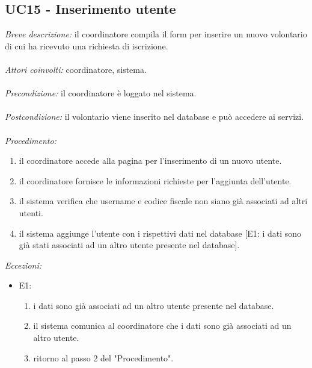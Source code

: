\subsection{UC15 - Inserimento utente}
\textit{Breve descrizione:} il coordinatore compila il form per inserire un nuovo volontario di cui ha ricevuto una richiesta di iscrizione. 
\\
\\
\textit{Attori coinvolti:} coordinatore, sistema.
\\
\\
\textit{Precondizione:} il coordinatore è loggato nel sistema.
\\
\\
\textit{Postcondizione:} il volontario viene inserito nel database e può accedere ai servizi.
\\
\\
\textit{Procedimento:}
\begin{enumerate}
	\item il coordinatore accede alla pagina per l'inserimento di un nuovo utente.
	\item il coordinatore fornisce le informazioni richieste per l'aggiunta dell'utente.
	\item il sistema verifica che username e codice fiscale non siano già associati ad altri utenti.
	\item il sistema aggiunge l'utente con i rispettivi dati nel database [E1: i dati sono già stati associati ad un altro utente presente nel database].
\end{enumerate}


\textit{Eccezioni:}
\begin{itemize}
	\item E1:
	\begin{enumerate}
		\item i dati sono già associati ad un altro utente presente nel database.
		\item il sistema comunica al coordinatore che i dati sono già associati ad un altro utente.
		\item ritorno al passo 2 del "Procedimento".
	\end{enumerate}
\end{itemize}

